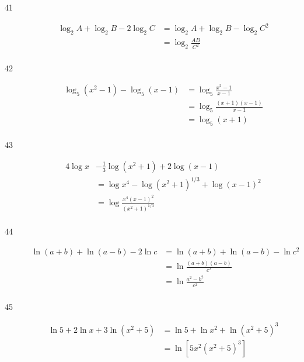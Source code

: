 \documentclass{exam}
\begin{document}
\begin{description}
      \item[41] 
        \begin{align*}
          \log_2 A + \log_2 B - 2 \log_2 C &= \log_2 A + \log_2 B - \log_2 C^2 \\
                                           &= \boxed{\log_2 \frac{AB}{C^2}} \\
        \end{align*}

      \item[42] 
        \begin{align*}
          \log_5 \left( x^2 - 1 \right) - \log_5 \left( x - 1 \right) &= \log_5 \frac{x^2 - 1}{x - 1} \\
                                            &= \log_5 \frac{(x + 1)(x - 1)}{x - 1} \\
                                            &= \boxed{\log_5 (x + 1)} \\
        \end{align*}

      \item[43] 
        \begin{align*}
          4 \log x &- \frac{1}{3} \log \left( x^2 + 1 \right) + 2 \log \left( x - 1 \right) \\
                   &= \log x^4 - \log \left( x^2 + 1 \right)^{1/3} + \log \left( x - 1 \right)^2 \\
                   &= \boxed{\log \frac{x^4 \left( x - 1 \right)^2}{\left( x^2 + 1 \right)^{1/3}}} \\
        \end{align*}

      \item[44] 
        \begin{align*}
          \ln(a + b) + \ln(a - b) - 2 \ln c &= \ln(a + b) + \ln(a - b) - \ln c^2 \\
                                            &= \ln \frac{(a + b)(a - b)}{c^2} \\
                                            &= \boxed{\ln \frac{a^2 - b^2}{c^2}} \\
        \end{align*}

      \item[45] 
        \begin{align*}
          \ln 5 + 2 \ln x + 3 \ln \left( x^2 + 5 \right) &= \ln 5 + \ln x^2 + \ln \left( x^2 + 5 \right)^3 \\
                                                         &= \boxed{\ln \left[ 5x^2 \left( x^2 + 5 \right)^3 \right]} \\
        \end{align*}


\end{description}
\end{document}
